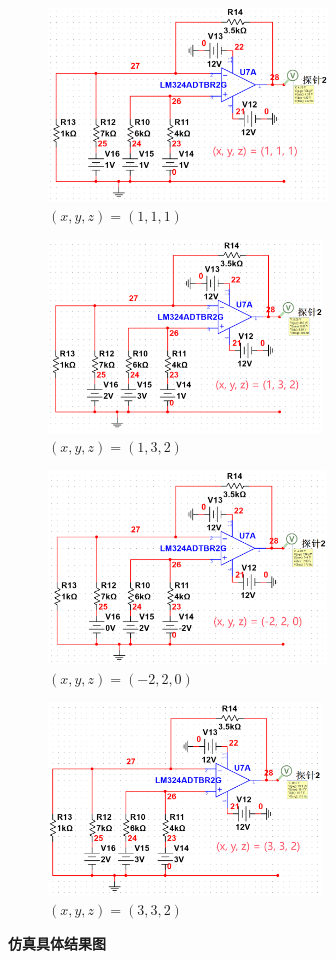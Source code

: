 \documentclass[UTF8]{report}
\theoremstyle{MyLineTheoremStyle} %
\theoremstyle{MyBlockTheoremStyle} %
\theoremstyle{MySubsubsectionStyle} %
\begin{document}
\begin{figure}[H]\centering
\begin{subfigure}[t]{0.48\textwidth}\centering
    \includegraphics[height=145pt]{assets/3/111.png}
    \caption{\bfseries $(x,y,z) = (1,1,1)$ }
\end{subfigure}\begin{subfigure}[t]{0.48\textwidth}\centering
    \includegraphics[height=145pt]{assets/3/132.png}
    \caption{\bfseries $(x,y,z) = (1,3,2)$ }
\end{subfigure}
\begin{subfigure}[t]{0.48\textwidth}\centering
    \includegraphics[height=145pt]{assets/3/91f965079537c7c35944182511dce291.png}
    \caption{\bfseries $(x,y,z) = (-2,2,0)$ }
\end{subfigure}\begin{subfigure}[t]{0.48\textwidth}\centering
    \includegraphics[height=145pt]{assets/3/def5c414621689edf67e4afb5251cf4a.png}
    \caption{\bfseries $(x,y,z) = (3,3,2)$ }
\end{subfigure}
\caption{\bfseries 仿真具体结果图 }\label{一个图}
\end{figure}
\end{document}
